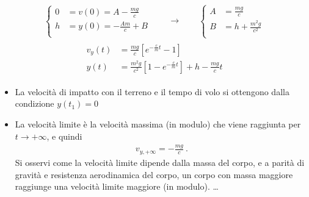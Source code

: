 \documentclass[letterpaper,10pt,italian]{jupyterBook}
\begin{document}
\begin{equation*}
\begin{split}\begin{cases}
  0 & = v(0) = A - \frac{mg}{c} \\
  h & = y(0) = -\frac{Am}{c} + B \\
\end{cases}
\qquad \rightarrow \qquad
\begin{cases}
  A & = \frac{mg}{c} \\
  B & = h + \frac{m^2 g}{c^2} \\
\end{cases}
\end{split}
\end{equation*}\begin{equation*}
\begin{split}\begin{aligned}
  v_y(t) & = \frac{mg}{c} \left[ e^{-\frac{c}{m}t} - 1 \right] \\
    y(t) & = \frac{m^2 g}{c^2} \left[ 1 - e^{-\frac{c}{m}t} \right] + h - \frac{mg}{c} t
\end{aligned}\end{split}
\end{equation*}\begin{itemize}
\item {} 
\sphinxAtStartPar
La velocità di impatto con il terreno e il tempo di volo si ottengono dalla condizione \(y(t_1) = 0\) 

\item {} 
\sphinxAtStartPar
La velocità limite è la velocità massima (in modulo) che  viene raggiunta per \(t \rightarrow +\infty\), e quindi
\begin{equation*}
\begin{split}v_{y,+\infty} = - \frac{m g}{c} \ .\end{split}
\end{equation*}
\sphinxAtStartPar
Si osservi come la velocità limite dipende dalla massa del corpo, e a parità di gravità e resistenza aerodinamica del corpo, un corpo con massa maggiore raggiunge una velocità limite maggiore (in modulo).
…

\end{itemize}
\end{document}
